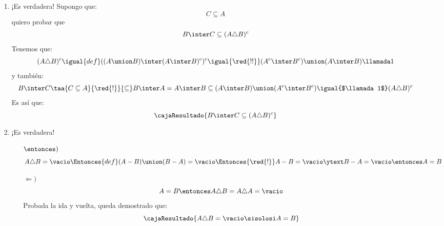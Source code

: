 \begin{enumerate}[label=\roman*)]
  \item ¡Es verdadera! Supongo que:
        $$
          C \subseteq A
        $$
        quiero probar que
        $$
          B \inter C \subseteq (A \triangle B)^c
        $$
        Tenemos que:
        $$
          (A \triangle B)^c \igual{def} ((A \union B) \inter (A \inter B)^c)^c
          \igual{\red{!!}} (A^c \inter B^c) \union (A \inter B) \llamada1
        $$
        y también:
        $$
          B \inter C \taa{C \subseteq A}{\red{!}}{\subseteq}
          B \inter A = A \inter B \subseteq (A \inter B) \union (A^c \inter B^c)
          \igual{$\llamada1$}
          (A \triangle B)^c
        $$
        Es así que:
        $$
          \cajaResultado{
            B \inter C \subseteq (A \triangle B)^c
          }
        $$

  \item ¡Es verdadera!
        \begin{itemize}
          \item[$\entonces)$]
                $$
                  A \triangle B = \vacio
                  \Entonces{def}
                  (A - B) \union (B - A) = \vacio
                  \Entonces{\red{!}}
                  A - B = \vacio \ytext B - A = \vacio
                  \entonces
                  A = B
                $$

          \item[$\Leftarrow)$]
                $$
                  A = B \entonces A \triangle B = A \triangle A = \vacio
                $$
                Probada la ida y vuelta, queda demostrado que:
                $$
                  \cajaResultado{
                    A \triangle B = \vacio \sisolosi A = B
                  }
                $$
        \end{itemize}
\end{enumerate}

\begin{aportes}
  \item {}
  \item {}
\end{aportes}

